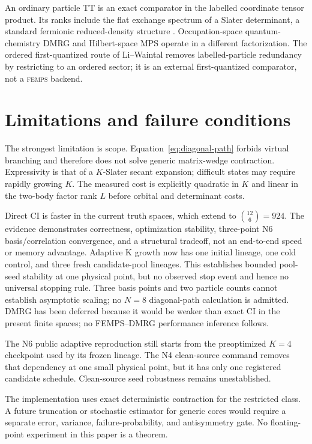\documentclass[11pt]{article}
\newcommand{\FEMPS}{\textnormal{\textsc{femps}}}
\begin{document}
An ordinary particle TT \cite{Oseledets2011TT} is an exact comparator in the
labelled coordinate tensor product.  Its ranks include the flat exchange
spectrum of a Slater determinant, a standard fermionic reduced-density
structure \cite{Coleman1963FermionRDM}.  Occupation-space quantum-chemistry
DMRG \cite{ChanSharma2011DMRG} and Hilbert-space MPS
\cite{LiChan2016HSMPS} operate in a different factorization.  The ordered
first-quantized route of Li--Waintal \cite{LiWaintal2026FirstQuantization}
removes labelled-particle redundancy by restricting to an ordered sector; it
is an external first-quantized comparator, not a \FEMPS{} backend.

\section{Limitations and failure conditions}

The strongest limitation is scope.  Equation~\eqref{eq:diagonal-path} forbids
virtual branching and therefore does not solve generic matrix-wedge
contraction.  Expressivity is that of a $K$-Slater secant expansion; difficult
states may require rapidly growing $K$.  The measured cost is explicitly
quadratic in $K$ and linear in the two-body factor rank $L$ before orbital and
determinant costs.

Direct CI is faster in the current truth spaces, which extend to
$\binom{12}{6}=924$.  The evidence demonstrates correctness, optimization
stability, three-point N6 basis/correlation convergence, and a structural
tradeoff, not an end-to-end speed or memory advantage.  Adaptive K growth now
has one initial lineage, one cold control, and three fresh candidate-pool lineages.
This establishes bounded pool-seed stability at one physical point,
but no observed stop event and hence no universal stopping rule.  Three basis points and
two particle counts cannot establish asymptotic scaling; no $N=8$ diagonal-path
calculation is admitted.  DMRG has been deferred
because it would be weaker than exact CI in the present finite spaces; no
FEMPS--DMRG performance inference follows.

The N6 public adaptive reproduction still starts from the preoptimized $K=4$
checkpoint used by its frozen lineage.  The N4 clean-source command removes
that dependency at one small physical point, but it has only one registered
candidate schedule.  Clean-source seed robustness remains unestablished.

The implementation uses exact deterministic contraction for the restricted
class.  A future truncation or stochastic estimator for generic cores would
require a separate error, variance, failure-probability, and antisymmetry gate.
No floating-point experiment in this paper is a theorem.
\end{document}
